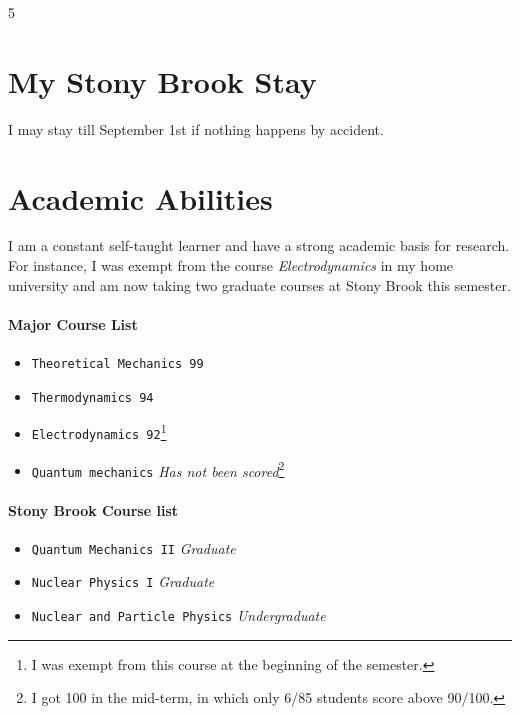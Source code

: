 \documentclass[margin]{res}
\begin{document}

\address{{\bf E-mail and Phone number} \\yerong.li@stonybrook.edu\\ li.yerong@smail.nju.edu.cn \\
        \mbox{(631) 432-2160}}
\address{{\bf Present Address} \\ Room 303C,West Apartment\\ Stony Brook University \\
        Stony Brook, NY 11794 }5


\begin{resume}

\section{My Stony Brook Stay}
I may stay till September 1st if nothing happens by accident.



\section{Academic Abilities}
I am a constant self-taught learner and have a strong academic basis for research. For instance, I was exempt from the course \emph{Electrodynamics} in my home university and am now taking two graduate courses at Stony Brook this semester.
\paragraph{Major Course List}
 \begin{itemize} \itemsep -2pt
                 \item  \verb|Theoretical Mechanics 99|
                 \item  \verb|Thermodynamics 94|
                 \item  \verb|Electrodynamics 92|\footnote{I was exempt from this course at the beginning of the semester.}
                 \item  \verb|Quantum mechanics| \emph{Has not been scored}\footnote{I got 100 in the mid-term, in which only 6/85 students score above 90/100.}
 \end{itemize}

\paragraph{Stony Brook Course list}
   \begin{itemize} \itemsep -2pt
                 \item  \verb|Quantum Mechanics II| \emph{Graduate}
                 \item  \verb|Nuclear Physics I| \emph{Graduate}
                 \item  \verb|Nuclear and Particle Physics| \emph{Undergraduate}
   \end{itemize}

\end{resume}
\end{document}
